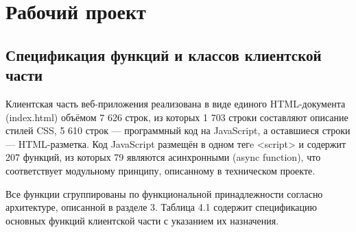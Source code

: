 \section{Рабочий проект}
\subsection{Спецификация функций и классов клиентской части}

Клиентская часть веб-приложения реализована в виде единого HTML-документа (index.html) объёмом 7 626 строк, из которых 1 703 строки составляют описание стилей CSS, 5 610 строк — программный код на JavaScript, а оставшиеся строки — HTML-разметка. Код JavaScript размещён в одном тегe <script> и содержит 207 функций, из которых 79 являются асинхронными (async function), что соответствует модульному принципу, описанному в техническом проекте.

Все функции сгруппированы по функциональной принадлежности согласно архитектуре, описанной в разделе 3. Таблица 4.1 содержит спецификацию основных функций клиентской части с указанием их назначения.


